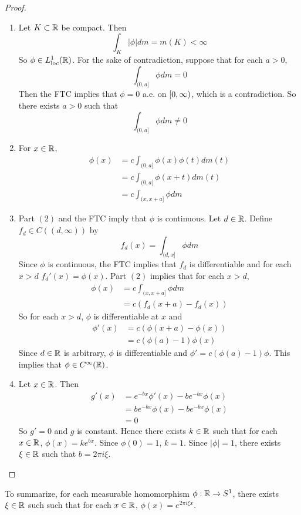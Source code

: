 \documentclass{book}
\begin{document}
	\begin{proof}\
	\begin{enumerate}
	\item Let $K \subset \mathbb{R}$ be compact. Then $$\int_K |\phi| dm = m(K) < \infty$$ So $\phi \in L^1_{\text{loc}}(\mathbb{R})$. For the sake of contradiction, suppose that for each $a >0$, $$\int_{(0,a]}\phi dm = 0$$ 
	Then the FTC implies that $\phi = 0$ a.e. on $[0,\infty)$, which is a contradiction. So there exists $a > 0$ such that $$\int_{(0,a]}\phi dm \neq 0$$
	\item For $x \in \mathbb{R}$, 
	\begin{align*}
	\phi(x) 
	&= c \int_{(0,a]} \phi(x)\phi(t) dm(t) \\
	&= c \int_{(0,a]} \phi(x+t) dm(t) \\
	&= c \int_{(x,x+a]} \phi dm 
	\end{align*}
	\item Part $(2)$ and the FTC imply that $\phi$ is continuous. Let $d \in \mathbb{R}$. Define $f_d \in C((d, \infty))$ by $$f_d(x) = \int_{(d, x]} \phi dm$$ 
	Since $\phi$ is continuous, the FTC implies that $f_d$ is differentiable and for each $x >d$ $f_d'(x) = \phi(x)$. Part $(2)$ implies that for each $x > d$,
	\begin{align*}
	\phi(x) 
	&= c \int_{(x,x+a]} \phi dm \\
	&= c(f_d(x+a) - f_d(x))
	\end{align*}
	So for each $x > d$, $\phi$ is differentiable at $x$ and 
	\begin{align*}
	\phi'(x) 
	&= c(\phi(x+a) - \phi(x)) \\
	&= c(\phi(a) - 1) \phi(x)
\end{align*}	 
	Since $d \in \mathbb{R}$ is arbitrary, $\phi$ is differentiable and $\phi' = c(\phi(a) - 1) \phi$. This implies that $\phi \in C^{\infty}(\mathbb{R})$.
	\item Let $x \in \mathbb{R}$. Then 
	\begin{align*}
	g'(x) 
	&= e^{-bx}\phi'(x) - be^{-bx}\phi(x) \\
	&= be^{-bx} \phi(x) - be^{-bx}\phi(x) \\
	&= 0
	\end{align*}
	So $g' = 0$ and $g$ is constant. Hence there exists $k \in \mathbb{R}$ such that for each $x \in \mathbb{R}$, $\phi(x) = ke^{bx}$. Since $\phi(0) = 1$, $k = 1$. Since $|\phi| = 1$, there exists $\xi \in \mathbb{R}$ such that $b = 2 \pi i \xi$. 
	\end{enumerate}
	\end{proof}
	
	\begin{note}
	To summarize, for each measurable homomorphism $\phi:\mathbb{R} \rightarrow S^1$, there exists $\xi \in \mathbb{R}$ such  such that for each $x \in \mathbb{R}$, $\phi(x) = e^{2 \pi i  \xi x}$. 
	\end{note}
	
\end{document}
